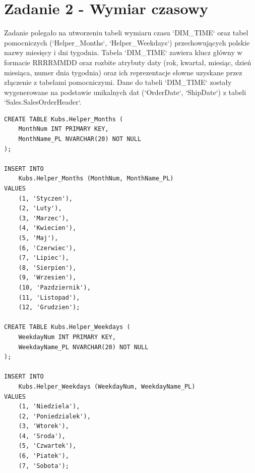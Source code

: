 \documentclass[a4paper,12pt]{article}
\begin{document}
\section{Zadanie 2 - Wymiar czasowy}

Zadanie polegało na utworzeniu tabeli wymiaru czasu `DIM\_TIME` oraz tabel pomocniczych (`Helper\_Months`, `Helper\_Weekdays`) przechowujących polskie nazwy miesięcy i dni tygodnia. Tabela `DIM\_TIME` zawiera klucz główny w formacie RRRRMMDD oraz rozbite atrybuty daty (rok, kwartał, miesiąc, dzień miesiąca, numer dnia tygodnia) oraz ich reprezentacje słowne uzyskane przez złączenie z tabelami pomocniczymi. Dane do tabeli `DIM\_TIME` zostały wygenerowane na podstawie unikalnych dat (`OrderDate`, `ShipDate`) z tabeli `Sales.SalesOrderHeader`.

\begin{lstlisting}[caption={Tworzenie tabel pomocniczych dla wymiaru czasu.}, label=lst:zad2_helpers]
CREATE TABLE Kubs.Helper_Months (
    MonthNum INT PRIMARY KEY,
    MonthName_PL NVARCHAR(20) NOT NULL
);

INSERT INTO
    Kubs.Helper_Months (MonthNum, MonthName_PL)
VALUES
    (1, 'Styczen'),
    (2, 'Luty'),
    (3, 'Marzec'),
    (4, 'Kwiecien'),
    (5, 'Maj'),
    (6, 'Czerwiec'),
    (7, 'Lipiec'),
    (8, 'Sierpien'),
    (9, 'Wrzesien'),
    (10, 'Pazdziernik'),
    (11, 'Listopad'),
    (12, 'Grudzien');

CREATE TABLE Kubs.Helper_Weekdays (
    WeekdayNum INT PRIMARY KEY,
    WeekdayName_PL NVARCHAR(20) NOT NULL
);

INSERT INTO
    Kubs.Helper_Weekdays (WeekdayNum, WeekdayName_PL)
VALUES
    (1, 'Niedziela'),
    (2, 'Poniedzialek'),
    (3, 'Wtorek'),
    (4, 'Sroda'),
    (5, 'Czwartek'),
    (6, 'Piatek'),
    (7, 'Sobota');
\end{lstlisting}
\end{document}
